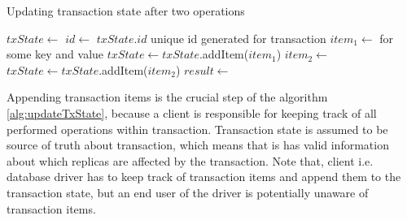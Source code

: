 

\begin{algorithm}
  \caption{Updating transaction state after two operations}
  \label{alg:updateTxState}
  \begin{algorithmic}  	    
    \State $txState \gets$ 
    \State $id \gets$ $txState.id$ unique id generated for transaction
    \State $item_{1} \gets $  \Comment for some key and value
    \State $txState \gets txState$.addItem($item_{1}$)
    \State $item_{2} \gets $ 
    \State $txState \gets txState$.addItem($item_{2}$)
    \State $result \gets $     
  \end{algorithmic}
\end{algorithm}

Appending transaction items is the crucial step of the algorithm \ref{alg:updateTxState}, because a client is responsible for keeping track of all performed operations within transaction. Transaction state is assumed to be source of truth about transaction, which means that is has valid information about which replicas are affected by the transaction.
Note that, client i.e. database driver has to keep track of transaction items and append them to the transaction state, but an end user of the driver is potentially unaware of transaction items.



